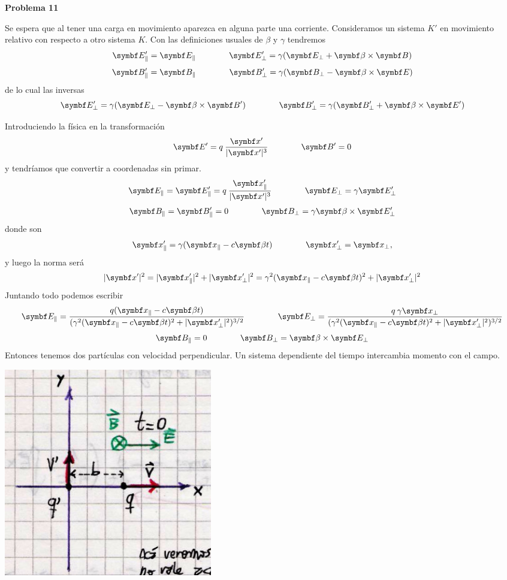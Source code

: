 \documentclass[10pt,oneside]{CBFT_book}
\begin{document}
\begin{ejemplo}{\bf Problema 11}
 
Se espera que al tener una carga en movimiento aparezca en alguna parte una corriente.
Consideramos un sistema $K'$ en movimiento relativo con respecto a otro sistema $K$.
Con las definiciones usuales de $\beta$ y $\gamma$ tendremos
\[
	\vb{E}_\parallel' = \vb{E}_\parallel \qquad \qquad  
	\vb{E}_\perp' = \gamma ( \vb{E}_\perp + \pv{\beta}{B} )
\]
\[
	\vb{B}_\parallel' = \vb{B}_\parallel \qquad \qquad  
	\vb{B}_\perp' = \gamma ( \vb{B}_\perp - \pv{\beta}{E} )
\]
de lo cual las inversas
\[
	\vb{E}_\perp' = \gamma ( \vb{E}_\perp - \pv{\beta}{B}' ) \qquad \qquad 
	\vb{B}_\perp' = \gamma ( \vb{B}_\perp' + \pv{\beta}{E}' )
\]

Introduciendo la física en la transformación
\[
	\vb{E}' = q \: \frac{\vb{x}'}{|\vbx'|^3} \qquad \qquad \vb{B}' = 0
\]
y tendríamos que convertir a coordenadas sin primar.
\[
	\vb{E}_\parallel = \vb{E}_\parallel' =  q \: \frac{\vb{x}_\parallel'}{|\vbx'|^3} 
	\qquad \qquad  \vb{E}_\perp = \gamma \vb{E}_\perp' 
\]
\[
	\vb{B}_\parallel = \vb{B}_\parallel' = 0 \qquad \qquad  
	\vb{B}_\perp = \gamma \pv{\beta}{E}_\perp' 
\] 
donde son
\[
	\vbx_\parallel' = \gamma ( \vbx_\parallel - c \vb{\beta}t ) 
	\qquad \qquad \vbx_\perp' = \vbx_\perp,
\]
y luego la norma será
\[
	|\vbx'|^2 = |\vbx_\parallel'|^2 + |\vbx_\perp'|^2 =
	\gamma^2 ( \vbx_\parallel - c \vb{\beta}t )^2 + |\vbx_\perp'|^2
\]
Juntando todo podemos escribir
\[
	\vb{E}_\parallel = \frac{q ( \vbx_\parallel - c \vb{\beta}t ) }
	{ (\gamma^2 ( \vbx_\parallel - c \vb{\beta}t )^2 + |\vbx_\perp'|^2)^{3/2} } 
	\qquad \qquad  
	\vb{E}_\perp = \frac{ q \: \gamma \vbx_\perp }
	{ (\gamma^2 ( \vbx_\parallel - c \vb{\beta}t )^2 + |\vbx_\perp'|^2)^{3/2} } 
\]
\[
	\vb{B}_\parallel = 0 \qquad \qquad  
	\vb{B}_\perp = \pv{\beta}{E}_\perp 
\] 
Entonces tenemos dos partículas con velocidad perpendicular.
Un sistema dependiente del tiempo intercambia momento con el campo.
 
\includegraphics[width=0.4\textwidth]{images/fig_ft1_speRel_prob11A.jpg} 
 

\end{ejemplo}
\end{document}
